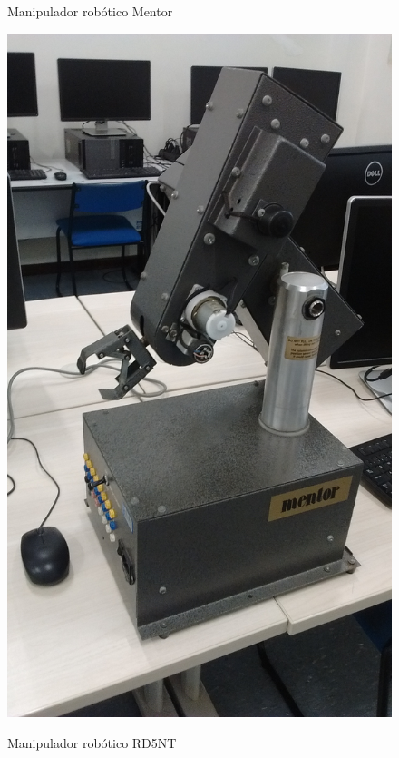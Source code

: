 \begin{figure}[H]
    \begin{minipage}{.5\textwidth}
        \centering
        \caption{Manipulador robótico Mentor}
        \includegraphics[keepaspectratio=true, width=0.9\linewidth]
            {img/foto-manipulador-preto.jpg}
        \label{fig:fotoManipuladorMentor}
    \end{minipage}
    \begin{minipage}{.5\textwidth}
        \centering
        \caption{Manipulador robótico RD5NT}

\end{minipage}
\end{figure}
